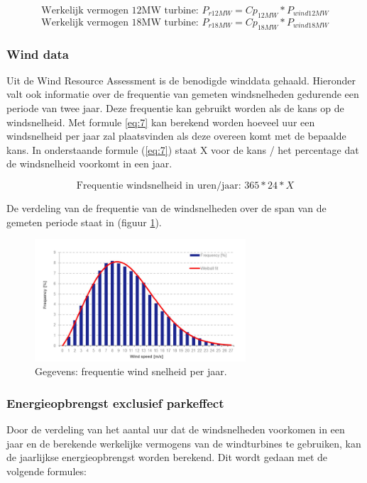 \begin{equation} \label{eq:5}
\text{Werkelijk vermogen 12MW turbine: } P_{r12MW}=Cp_{12MW}*P_{wind12MW}
\end{equation}
\begin{equation} \label{6}
\text{Werkelijk vermogen 18MW turbine: } P_{r18MW}=Cp_{18MW}*P_{wind18MW}
\end{equation}
\subsubsection{Wind data}
Uit de Wind Resource Assessment\cite{WindResourceAssessment} is de benodigde winddata gehaald. Hieronder valt ook informatie over de frequentie van gemeten windsnelheden gedurende een periode van twee jaar. Deze frequentie kan gebruikt worden als de kans op de windsnelheid. Met formule \ref{eq:7} kan berekend worden hoeveel uur een windsnelheid per jaar zal plaatsvinden als deze overeen komt met de bepaalde kans. In onderstaande formule (\ref{eq:7}) staat X voor de kans / het percentage dat de windsnelheid voorkomt in een jaar. 

\begin{equation} \label{eq:7}
\text{Frequentie windsnelheid in uren/jaar: } 365*24*X 
\end{equation}

De verdeling van de frequentie van de windsnelheden over de span van de gemeten periode\cite{WindResourceAssessment} staat in (figuur \ref{fig:Frequentieverdeling}). 
\begin{figure}[H]
\centering
\includegraphics[width=0.7\textwidth]{IMG/data/overzicht/Frequentieverdelingwind.PNG}
\caption{Gegevens: frequentie wind snelheid per jaar.}
\label{fig:Frequentieverdeling}
\end{figure}

\subsubsection{Energieopbrengst exclusief parkeffect}
Door de verdeling van het aantal uur dat de windsnelheden voorkomen in een jaar en de berekende werkelijke vermogens van de windturbines te gebruiken, kan de jaarlijkse energieopbrengst worden berekend. Dit wordt gedaan met de volgende formules: 

